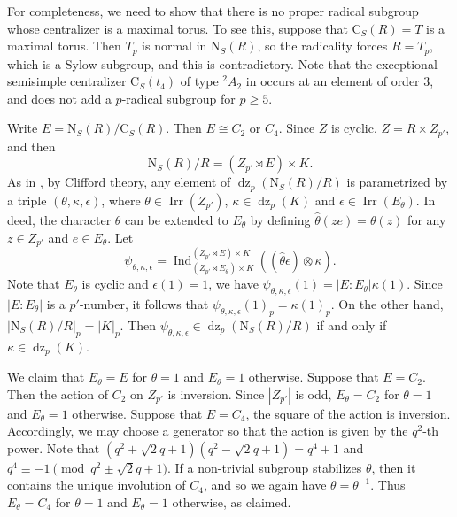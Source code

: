 \documentclass[11pt,a4paper]{article}
\numberwithin{equation}{section}
\theoremstyle{definition}
\theoremstyle{remark}
\newcommand{\Irr}{\operatorname{Irr}}
\newcommand{\dz}{\operatorname{dz}}
\newcommand{\NN}{\mathrm N}
\newcommand{\CC}{\mathrm C}
\newcommand{\Ind}{\operatorname{Ind}}
\begin{document}
For completeness, we need to show that there is no proper radical subgroup whose centralizer is a maximal torus. To see this, suppose that $\CC_S(R)=T$ is a maximal torus. Then $T_p$ is normal in $\NN_S(R)$, so the radicality forces $R=T_p$, which is a Sylow subgroup, and this is contradictory. 
Note that the exceptional semisimple centralizer $\CC_S(t_4)$ of type ${}^2A_2$ in \cite[TABLE I]{An} occurs at an element of order $3$, and does not add a $p$-radical subgroup for $p\geq5$.

Write $E=\NN_S(R)/\CC_S(R)$. Then $E\cong C_2$ or $C_4$. Since \(Z\) is cyclic, $Z=R\times Z_{p'}$,
and then
\[
\NN_S(R)/R=(Z_{p'}\rtimes E)\times K.
\]
As in \cite[Sections 3 and 5]{Malle}, by Clifford theory, any element of $\dz_p(\NN_S(R)/R)$ is parametrized by a triple \((\theta,\kappa,\epsilon)\), where \(\theta\in\Irr(Z_{p'})\), \(\kappa\in\dz_p(K)\) and \(\epsilon\in\Irr(E_\theta)\). In deed, the character \(\theta\) can be extended to $E_\theta$ by defining
$\widehat\theta(ze)=\theta(z)$ for any $z\in Z_{p'}$ and $e\in E_\theta$. Let
\begin{equation}\label{eq:rankone}
 \psi_{\theta,\kappa,\epsilon}=
 \Ind_{(Z_{p'}\rtimes E_\theta)\times K}^{(Z_{p'}\rtimes E)\times K}
((\widehat\theta\epsilon)\otimes\kappa).
\end{equation}
Note that \(E_\theta\) is cyclic and \(\epsilon(1)=1\), we have
$\psi_{\theta,\kappa,\epsilon}(1)
=|E:E_\theta|\kappa(1)$. Since \(|E:E_\theta|\) is a \(p'\)-number, it follows that
$\psi_{\theta,\kappa,\epsilon}(1)_p=\kappa(1)_p$.
On the other hand, $|\NN_S(R)/R|_p=|K|_p$.
Then $\psi_{\theta,\kappa,\epsilon}\in\dz_p(\NN_S(R)/R)$ if and only if  $\kappa\in\operatorname{dz}_p(K)$.

We claim that $E_\theta=E$ for $\theta=1$ and $E_\theta=1$ otherwise. Suppose that  \(E=C_2\).  Then the action of \(C_2\) on \(Z_{p'}\) is inversion. Since \(|Z_{p'}|\) is odd, $E_\theta=C_2$ for $\theta=1$ and $E_\theta=1$ otherwise. Suppose that 
\(E=C_4\), the square of the action  is inversion. Accordingly, we may choose a generator so that the action is given by the \(q^2\)-th power.
Note that $(q^2+\sqrt{2}q+1)(q^2-\sqrt{2}q+1)=q^4+1$  and $q^4\equiv-1\pmod{q^2\pm\sqrt{2}q+1}$.
If a non-trivial subgroup stabilizes \(\theta\), then it contains the unique involution of \(C_4\), and so we again have \(\theta=\theta^{-1}\). Thus
$E_\theta=C_4$ for $\theta=1$ and $E_\theta=1$ otherwise, as claimed.
\end{document}
